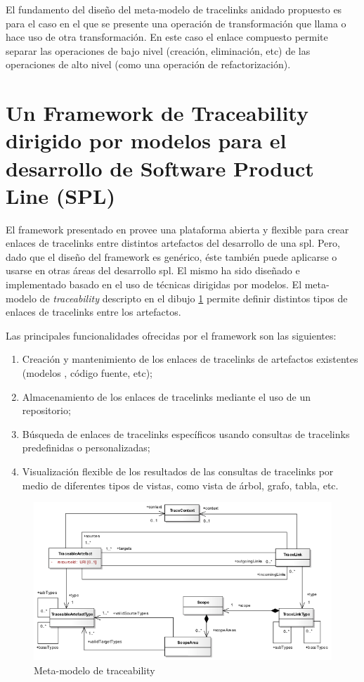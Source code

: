 \documentclass[a4paper,12pt,oneside,spanish]{book}
\begin{document}
El fundamento del diseño del meta-modelo de tracelinks anidado propuesto es para el caso en el que se presente una operación de transformación que llama o hace uso de otra transformación. En este caso el enlace compuesto permite separar las operaciones de bajo nivel (creación, eliminación, etc) de las operaciones de alto nivel (como una operación de refactorización).

\section{Un Framework de Traceability dirigido por modelos para el desarrollo de Software Product Line (SPL)}

El framework presentado en \cite{SousaKuleszaRummlerAnquetilMitschkeMoreiraAmaralAraujo} provee una plataforma abierta y flexible para crear enlaces de tracelinks entre distintos artefactos del desarrollo de una \gls{spl}. Pero, dado que el diseño del framework es genérico, éste también puede aplicarse o usarse en otras áreas del desarrollo \gls{spl}. El mismo ha sido diseñado e implementado basado en el uso de técnicas dirigidas por modelos. El meta-modelo de \textit{traceability} descripto en el dibujo \ref{fig:SPLMeta-modelo} permite definir distintos tipos de enlaces de tracelinks entre los artefactos.

Las principales funcionalidades ofrecidas por el framework son las siguientes:

\begin{enumerate}
\item Creación y mantenimiento de los enlaces de tracelinks de artefactos existentes (modelos , código fuente, etc);
\item Almacenamiento de los enlaces de tracelinks mediante el uso de un repositorio;
\item Búsqueda de enlaces de tracelinks específicos usando consultas de tracelinks predefinidas o personalizadas;
\item Visualización flexible de los resultados de las consultas de tracelinks por medio de diferentes tipos de vistas, como vista de árbol, grafo, tabla, etc.
\end{enumerate}

\begin{figure}[hbtp]
\centering
\includegraphics[scale=.6]{./img/Traceability_Metamodel}
\caption{Meta-modelo de traceability}
\label{fig:SPLMeta-modelo}
\end{figure}
\end{document}
